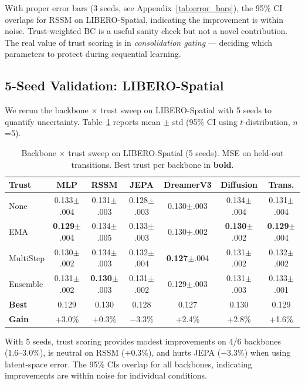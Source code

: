 \documentclass{article}
\begin{document}
With proper error bars (3 seeds, see Appendix~\ref{tab:error_bars}), the 95\% CI overlaps for RSSM on LIBERO-Spatial, indicating the improvement is within noise. Trust-weighted BC is a useful sanity check but not a novel contribution. The real value of trust scoring is in \emph{consolidation gating} — deciding which parameters to protect during sequential learning.

\subsection{5-Seed Validation: LIBERO-Spatial}

We rerun the backbone $\times$ trust sweep on LIBERO-Spatial with 5 seeds to quantify uncertainty. Table~\ref{tab:backbone_5seeds} reports mean $\pm$ std (95\% CI using $t$-distribution, $n$=5).

\begin{table}[h]
\centering
\caption{Backbone $\times$ trust sweep on LIBERO-Spatial (5 seeds). MSE on held-out transitions. Best trust per backbone in \textbf{bold}.}
\label{tab:backbone_5seeds}
\small
\begin{tabular}{lcccccc}
\toprule
Trust & MLP & RSSM & JEPA & DreamerV3 & Diffusion & Trans. \\
\midrule
None & 0.133$\pm$.004 & 0.131$\pm$.003 & 0.128$\pm$.003 & 0.130$\pm$.003 & 0.134$\pm$.004 & 0.131$\pm$.004 \\
EMA & \textbf{0.129}$\pm$.004 & 0.134$\pm$.005 & 0.133$\pm$.003 & 0.130$\pm$.002 & \textbf{0.130}$\pm$.002 & \textbf{0.129}$\pm$.004 \\
MultiStep & 0.130$\pm$.002 & 0.134$\pm$.003 & 0.132$\pm$.004 & \textbf{0.127}$\pm$.004 & 0.131$\pm$.002 & 0.132$\pm$.002 \\
Ensemble & 0.131$\pm$.002 & \textbf{0.130}$\pm$.003 & 0.131$\pm$.002 & 0.129$\pm$.003 & 0.131$\pm$.003 & 0.133$\pm$.001 \\
\midrule
\textbf{Best} & 0.129 & 0.130 & 0.128 & 0.127 & 0.130 & 0.129 \\
\textbf{Gain} & +3.0\% & +0.3\% & $-$3.3\% & +2.4\% & +2.8\% & +1.6\% \\
\bottomrule
\end{tabular}
\end{table}

With 5 seeds, trust scoring provides modest improvements on 4/6 backbones (1.6--3.0\%), is neutral on RSSM (+0.3\%), and hurts JEPA ($-$3.3\%) when using latent-space error. The 95\% CIs overlap for all backbones, indicating improvements are within noise for individual conditions.
\end{document}
